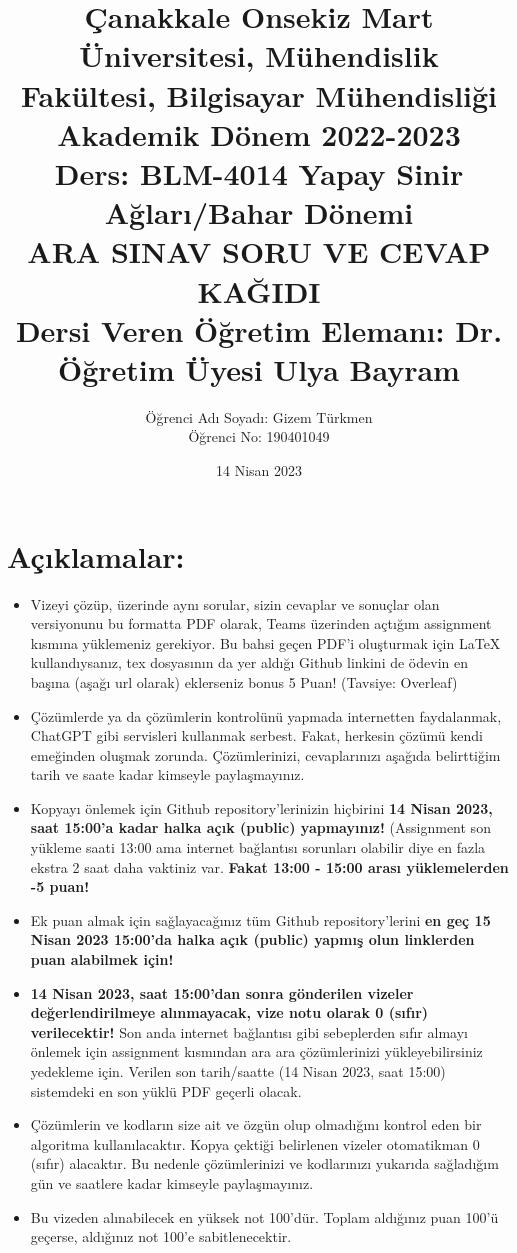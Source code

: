 \documentclass[11pt]{article}
\title{Çanakkale Onsekiz Mart Üniversitesi, Mühendislik Fakültesi, Bilgisayar Mühendisliği Akademik Dönem 2022-2023\\
Ders: BLM-4014 Yapay Sinir Ağları/Bahar Dönemi\\ 
ARA SINAV SORU VE CEVAP KAĞIDI\\
Dersi Veren Öğretim Elemanı: Dr. Öğretim Üyesi Ulya Bayram}
\author{%
\begin{minipage}{\textwidth}
\raggedright
Öğrenci Adı Soyadı: Gizem Türkmen\\ %
Öğrenci No: 190401049
\end{minipage}%
}
\date{14 Nisan 2023}
\begin{document}
\maketitle

\vspace{-.5in}
\section*{Açıklamalar:}
\begin{itemize}
    \item Vizeyi çözüp, üzerinde aynı sorular, sizin cevaplar ve sonuçlar olan versiyonunu bu formatta PDF olarak, Teams üzerinden açtığım assignment kısmına yüklemeniz gerekiyor. Bu bahsi geçen PDF'i oluşturmak için LaTeX kullandıysanız, tex dosyasının da yer aldığı Github linkini de ödevin en başına (aşağı url olarak) eklerseniz bonus 5 Puan! (Tavsiye: Overleaf)
    \item Çözümlerde ya da çözümlerin kontrolünü yapmada internetten faydalanmak, ChatGPT gibi servisleri kullanmak serbest. Fakat, herkesin çözümü kendi emeğinden oluşmak zorunda. Çözümlerinizi, cevaplarınızı aşağıda belirttiğim tarih ve saate kadar kimseyle paylaşmayınız. 
    \item Kopyayı önlemek için Github repository'lerinizin hiçbirini \textbf{14 Nisan 2023, saat 15:00'a kadar halka açık (public) yapmayınız!} (Assignment son yükleme saati 13:00 ama internet bağlantısı sorunları olabilir diye en fazla ekstra 2 saat daha vaktiniz var. \textbf{Fakat 13:00 - 15:00 arası yüklemelerden -5 puan!}
    \item Ek puan almak için sağlayacağınız tüm Github repository'lerini \textbf{en geç 15 Nisan 2023 15:00'da halka açık (public) yapmış olun linklerden puan alabilmek için!}
    \item \textbf{14 Nisan 2023, saat 15:00'dan sonra gönderilen vizeler değerlendirilmeye alınmayacak, vize notu olarak 0 (sıfır) verilecektir!} Son anda internet bağlantısı gibi sebeplerden sıfır almayı önlemek için assignment kısmından ara ara çözümlerinizi yükleyebilirsiniz yedekleme için. Verilen son tarih/saatte (14 Nisan 2023, saat 15:00) sistemdeki en son yüklü PDF geçerli olacak.
    \item Çözümlerin ve kodların size ait ve özgün olup olmadığını kontrol eden bir algoritma kullanılacaktır. Kopya çektiği belirlenen vizeler otomatikman 0 (sıfır) alacaktır. Bu nedenle çözümlerinizi ve kodlarınızı yukarıda sağladığım gün ve saatlere kadar kimseyle paylaşmayınız.
    \item Bu vizeden alınabilecek en yüksek not 100'dür. Toplam aldığınız puan 100'ü geçerse, aldığınız not 100'e sabitlenecektir.

\end{itemize}
\end{document}
